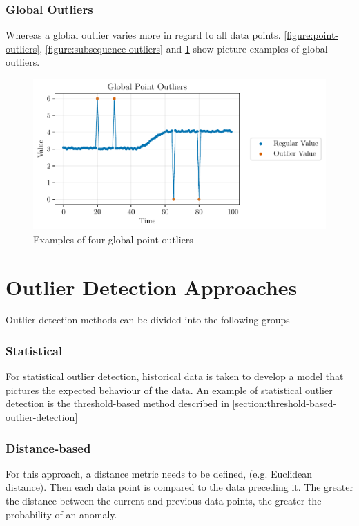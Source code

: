 \subsubsection{Global Outliers}
Whereas a global outlier varies more in regard to all data points. \autoref{figure:point-outliers}, \ref{figure:subsequence-outliers} and \ref{figure:global-point-outliers} show picture examples of global outliers.
\cite{blazquez-garciaReviewOutlierAnomaly2020}
\begin{figure}[H]
  \centering
  \includegraphics{./plots/pdfs/global_point_outliers.pdf}
  \caption{Examples of four global point outliers}
  \label{figure:global-point-outliers}
\end{figure}

\section{Outlier Detection Approaches}\label{section:outlier-detection-approaches}
Outlier detection methods can be divided into the following groups
\subsubsection{Statistical}
For statistical outlier detection, historical data is taken to develop a model that pictures the expected behaviour of the data. An example of statistical outlier detection is the threshold-based method described in \autoref{section:threshold-based-outlier-detection} \cite{cookAnomalyDetectionIoT2020, giannoniAnomalyDetectionModels2018}

\subsubsection{Distance-based}
For this approach, a distance metric needs to be defined, (e.g. Euclidean distance). Then each data point is compared to the data preceding it. The greater the distance between the current and previous data points, the greater the probability of an anomaly. \cite{cookAnomalyDetectionIoT2020, giannoniAnomalyDetectionModels2018, chandolaAnomalyDetectionSurvey2009}

